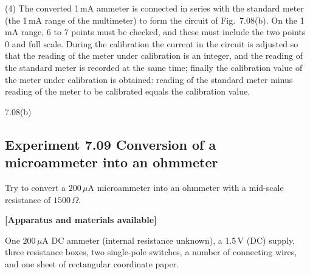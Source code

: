 (4) The converted 1\,mA ammeter is connected in series with the standard meter (the 1\,mA range of the multimeter) to form the circuit of Fig.~7.08(b). On the 1\,mA range, 6 to 7 points must be checked, and these must include the two points 0 and full scale. During the calibration the current in the circuit is adjusted so that the reading of the meter under calibration is an integer, and the reading of the standard meter is recorded at the same time; finally the calibration value of the meter under calibration is obtained: reading of the standard meter minus reading of the meter to be calibrated equals the calibration value.

\begin{figbox}{7.08(b)}
\end{figbox}

\subsection*{Experiment 7.09 \quad Conversion of a microammeter into an ohmmeter}

Try to convert a $200\,\mu$A microammeter into an ohmmeter with a mid-scale resistance of $1500\,\Omega$.

\textbf{[Apparatus and materials available]}

One $200\,\mu$A DC ammeter (internal resistance unknown), a 1.5\,V (DC) supply, three resistance boxes, two single-pole switches, a number of connecting wires, and one sheet of rectangular coordinate paper.


